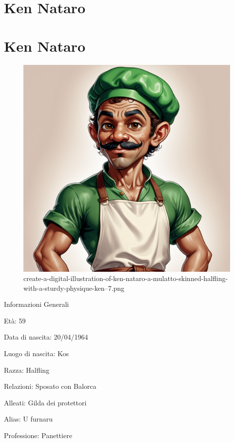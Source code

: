 \section{Ken Nataro}\label{ken-nataro}
\section{Ken Nataro}\label{ken-nataro-1}


\begin{figure}
\centering
\includegraphics{create-a-digital-illustration-of-ken-nataro-a-mulatto-skinned-halfling-with-a-sturdy-physique-ken--7.png}
\caption{create-a-digital-illustration-of-ken-nataro-a-mulatto-skinned-halfling-with-a-sturdy-physique-ken--7.png}
\end{figure}

Informazioni Generali

Età: 59

Data di nascita: 20/04/1964

Luogo di nascita: Kos

Razza: Halfling

Relazioni: Sposato con Balorca

Alleati: Gilda dei protettori

Alias: U furnaru

Professione: Panettiere


